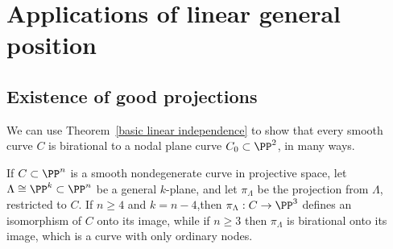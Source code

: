  
\section{Applications of linear general position}

\subsection{Existence of good projections}\label{projection section}\label{good projections}

We can use Theorem~\ref{basic linear independence} to show that every smooth curve $C$ is birational to a nodal plane curve $C_0 \subset \PP^2$, in many ways.

\begin{proposition}\label{nodal projection}
If $C \subset \PP^n$ is a smooth nondegenerate curve in projective space, let $\Lambda \cong \PP^{k} \subset \PP^n$ be a general $k$-plane, and let
$\pi_\Lambda$ be the projection from $\Lambda$, restricted to $C$. If $n\geq 4$ and $k=n-4$,then
$\pi_\Lambda: C \to \PP^3$ defines an isomorphism of $C$ onto its image, while if $n\geq 3$ then $\pi_\Lambda$ is birational onto its image, which is a curve with only ordinary nodes.
\end{proposition}

